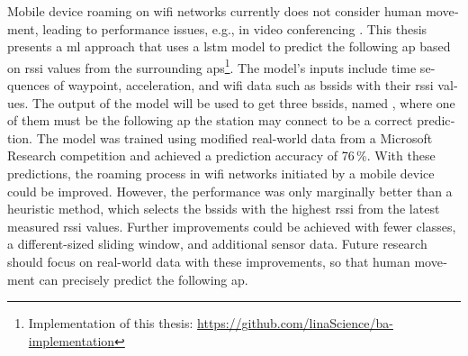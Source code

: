 \null\vfil
\begin{otherlanguage}{english}
\begin{center}\textsf{\textbf{\abstractname}}\end{center}

\noindent 
Mobile device roaming on \ac{wifi} networks currently does not consider human movement, leading to performance issues, e.g., in video conferencing \cite{handoff_performance_issues}.
This thesis presents a \ac{ml} approach that uses a \ac{lstm} model to predict the following \ac{ap} based on \ac{rssi} values from the surrounding \acp{ap}\footnote{Implementation of this thesis: \url{https://github.com/linaScience/ba-implementation}}.
The model's inputs include time sequences of waypoint, acceleration, and \ac{wifi} data such as \acp{bssid} with their \ac{rssi} values.
The output of the model will be used to get three \acp{bssid}, named \threeAP, where one of them must be the following \ac{ap} the station may connect to be a correct prediction.
The model was trained using modified real-world data from a Microsoft Research competition and achieved a prediction accuracy of 76\,\%.
With these predictions, the roaming process in \ac{wifi} networks initiated by a mobile device could be improved.
However, the performance was only marginally better than a heuristic method, which selects the \acp{bssid} with the highest \ac{rssi} from the latest measured \ac{rssi} values.
Further improvements could be achieved with fewer classes, a different-sized sliding window, and additional sensor data.
Future research should focus on real-world data with these improvements, so that human movement can precisely predict the following \ac{ap}.
\end{otherlanguage}
\vfil\null



